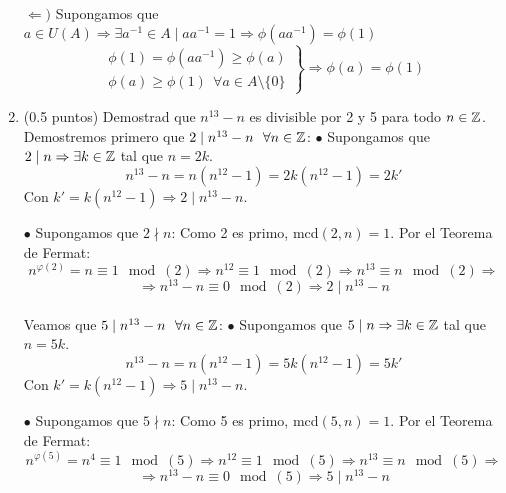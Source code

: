 \documentclass[12pt]{article}
\begin{document}
\begin{ejercicio}[4 puntos]
\begin{enumerate}
                \noindent
                $\Leftarrow)$ Supongamos que $a \in U(A) \Rightarrow \exists a^{-1} \in A \mid aa^{-1} = 1 \Rightarrow \phi(aa^{-1}) = \phi(1)$
                $$\left. \begin{array}{r}
                    \phi(1) = \phi(aa^{-1}) \geq \phi(a) \\
                    \phi(a) \geq \phi(1)~~\forall a \in A \setminus\{0\}
                \end{array}\right\}\Rightarrow \phi(a) = \phi(1)$$

            \item (0.5 puntos) Demostrad que $n^{13}-n$ es divisible por 2 y 5 para todo $n \in \mathbb{Z}$.\\

                \noindent
                Demostremos primero que $2 \mid n^{13}-n~~\forall n \in \mathbb{Z}$:\newline
                $\bullet$ Supongamos que $2 \mid n \Rightarrow \exists k \in \mathbb{Z}$ tal que $n = 2k$.
                $$n^{13}-n = n(n^{12}-1) = 2k(n^{12}-1)=2k'$$
                Con $k' = k(n^{12}-1) \Rightarrow 2 \mid n^{13}-n$.

                \noindent
                $\bullet$ Supongamos que $2 \nmid n$:\newline
                Como 2 es primo, mcd$(2,n) = 1$. Por el Teorema de Fermat:
                $$n^{\varphi(2)} = n \equiv 1 \mod (2) \Rightarrow n^{12} \equiv 1 \mod (2) \Rightarrow n^{13} \equiv n \mod (2) \Rightarrow$$
                $$\Rightarrow n^{13}-n \equiv 0 \mod (2) \Rightarrow 2 \mid n^{13}-n$$\\

                \noindent
                Veamos que $5 \mid n^{13}-n~~\forall n \in \mathbb{Z}$:\newline
                $\bullet$ Supongamos que $5 \mid n \Rightarrow \exists k \in \mathbb{Z}$ tal que $n = 5k$.
                $$n^{13}-n = n(n^{12}-1) = 5k(n^{12}-1)=5k'$$
                Con $k' = k(n^{12}-1) \Rightarrow 5 \mid n^{13}-n$.

                \noindent
                $\bullet$ Supongamos que $5 \nmid n$:\newline
                Como 5 es primo, mcd$(5,n) = 1$. Por el Teorema de Fermat:
                $$n^{\varphi(5)} = n^4 \equiv 1 \mod (5) \Rightarrow n^{12} \equiv 1 \mod (5) \Rightarrow n^{13} \equiv n \mod (5) \Rightarrow$$
                $$\Rightarrow n^{13}-n \equiv 0 \mod (5) \Rightarrow 5 \mid n^{13}-n$$



\end{enumerate}
\end{ejercicio}
\end{document}

